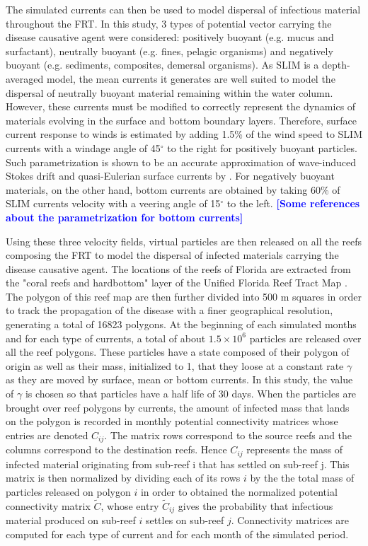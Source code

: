 \documentclass[utf8]{frontiersSCNS}
\newcommand{\lew}[1]{\textbf{\textcolor{blue}{#1}}}
\begin{document}
The simulated currents can then be used to model dispersal of infectious material throughout the FRT. In this study, 3 types of potential vector carrying the disease causative agent were considered: positively buoyant (e.g. mucus and surfactant), neutrally buoyant (e.g. fines, pelagic organisms) and negatively buoyant (e.g. sediments, composites, demersal organisms). As SLIM is a depth-averaged model, the mean currents it generates are well suited to model the dispersal of neutrally buoyant material remaining within the water column. However, these currents must be modified to correctly represent the dynamics of materials evolving in the surface and bottom boundary layers. Therefore, surface current response to winds is estimated by adding 1.5\% of the wind speed to SLIM currents with a windage angle of 45$^\circ$ to the right for positively buoyant particles. Such parametrization is shown to be an accurate approximation of wave-induced Stokes drift and quasi-Eulerian surface currents by \citep{ardhuin2009observation}. For negatively buoyant materials, on the other hand, bottom currents are obtained by taking 60\% of SLIM currents velocity with a veering angle of 15$^\circ$ to the left. \lew{[Some references about the parametrization for bottom currents]}

Using these three velocity fields, virtual particles are then released on all the reefs composing the FRT to model the dispersal of infected materials carrying the disease causative agent. The locations of the reefs of Florida are extracted from the "coral reefs and hardbottom" layer of the Unified Florida Reef Tract Map \citep{fwc2017unified}. The polygon of this reef map are then further divided into 500 m squares in order to track the propagation of the disease with a finer geographical resolution, generating a total of 16823 polygons. %
At the beginning of each simulated months and for each type of currents, a total of about $1.5 \times 10^6$ particles are released over all the reef polygons. These particles have a state composed of their polygon of origin as well as their mass, initialized to 1, that they loose at a constant rate $\gamma$ as they are moved by surface, mean or bottom currents. In this study, the value of $\gamma$ is chosen so that particles have a half life of 30 days. When the particles are brought over reef polygons by currents, the amount of infected mass that lands on the polygon is recorded in monthly potential connectivity matrices whose entries are denoted $C_{ij}$. The matrix rows correspond to the source reefs and the columns correspond to the destination reefs. Hence $C_{ij}$ represents the mass of infected material originating from sub-reef i that has settled on sub-reef j. This matrix is then normalized by dividing each of its rows $i$ by the the total mass of particles released on polygon $i$ in order to obtained the normalized potential connectivity matrix $\tilde{C}$, whose entry $\tilde{C}_{ij}$ gives the probability that infectious material produced on sub-reef $i$ settles on sub-reef $j$. Connectivity matrices are computed for each type of current and for each month of the simulated period.
\end{document}
